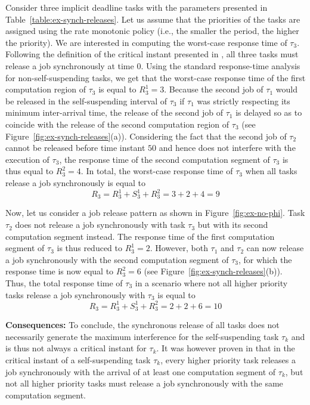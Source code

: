 Consider three implicit deadline tasks with the parameters presented in Table~\ref{table:ex-synch-releases}. Let us assume that the priorities of the tasks are assigned using the rate monotonic policy (i.e., the smaller the period, the higher the priority). We are interested in computing the worst-case response time of $\tau_3$. Following the definition of the critical instant presented in \cite{LR:rtas10}, all three tasks must release a job synchronously at time $0$. Using the standard response-time analysis for non-self-suspending tasks, we get that the worst-case response time of the first computation region of $\tau_3$ is equal to $R_3^1 = 3$. Because the second job of $\tau_1$ would be released in the self-suspending interval of $\tau_3$ if $\tau_1$ was strictly respecting its minimum inter-arrival time, the release of the second job of $\tau_1$ is delayed so as to coincide with the release of the second computation region of $\tau_3$ (see Figure~\ref{fig:ex-synch-releases}(a)). Considering the fact that the second job of $\tau_2$ cannot be released before time instant $50$ and hence does not interfere with the execution of $\tau_3$, the response time of the second computation segment of $\tau_3$ is thus equal to $R_3^2=4$. In total, the worst-case response time of $\tau_3$ when all tasks release a job synchronously is equal to 
$$R_3 = R_3^1 + S_3^1 + R_3^2 = 3 + 2 +4 = 9$$

Now, let us consider a job release pattern as shown in Figure~\ref{fig:ex-no-phi}. Task $\tau_2$ does not release a job synchronously with task $\tau_3$ but with its second computation segment instead. The response time of the first computation segment of $\tau_3$ is thus reduced to $R_3^1=2$. However, both $\tau_1$ and $\tau_2$ can now release a job synchronously with the second computation segment of $\tau_3$, for which the response time is now equal to $R_3^2=6$ (see Figure~\ref{fig:ex-synch-releases}(b)). Thus, the total response time of $\tau_3$ in a scenario where not all higher priority tasks release a job synchronously with $\tau_3$ is equal to 
$$R_3 = R_3^1 + S_3^1 + R_3^2 = 2+2+6 = 10$$

{\bf Consequences:} To conclude, the synchronous release of all tasks does not necessarily generate the maximum interference for the self-suspending task $\tau_k$ and is thus not always a critical instant for $\tau_k$. 
It was however proven in \cite{ecrts15nelissen} that in the critical instant of a self-suspending task $\tau_k$, every higher priority task releases a job synchronously with the arrival of at least one computation segment of $\tau_k$, but not all higher priority tasks must release a job synchronously with the same computation segment.

